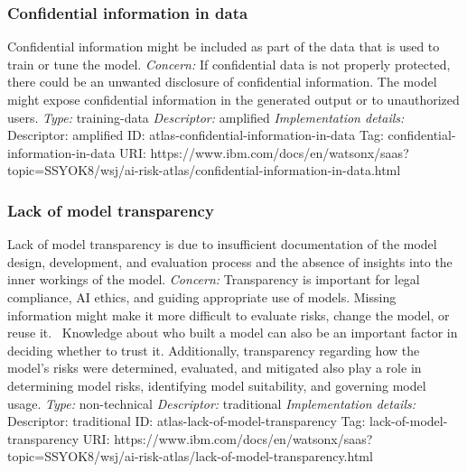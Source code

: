 \documentclass{article}
\begin{document}
\subsubsection*{Confidential information in data}
Confidential information might be included as part of the data that is used to train or tune the model.\newline
\textit{Concern: }If confidential data is not properly protected, there could be an unwanted disclosure of confidential information. The model might expose confidential information in the generated output or to unauthorized users.\newline\newline
\textit{Type: }training-data\newline
\textit{Descriptor: }amplified \newline\newline
\textit{Implementation details:} \newline
Descriptor: amplified \newline
ID: atlas-confidential-information-in-data \newline
Tag: confidential-information-in-data \newline
URI:  https://www.ibm.com/docs/en/watsonx/saas?topic=SSYOK8/wsj/ai-risk-atlas/confidential-information-in-data.html\newline
\subsubsection*{Lack of model transparency}
Lack of model transparency is due to insufficient documentation of the model design, development, and evaluation process and the absence of insights into the inner workings of the model.\newline
\textit{Concern: }Transparency is important for legal compliance, AI ethics, and guiding appropriate use of models. Missing information might make it more difficult to evaluate risks,  change the model, or reuse it.  Knowledge about who built a model can also be an important factor in deciding whether to trust it. Additionally, transparency regarding how the model's risks were determined, evaluated, and mitigated also play a role in determining model risks, identifying model suitability, and governing model usage.\newline\newline
\textit{Type: }non-technical\newline
\textit{Descriptor: }traditional \newline\newline
\textit{Implementation details:} \newline
Descriptor: traditional \newline
ID: atlas-lack-of-model-transparency \newline
Tag: lack-of-model-transparency \newline
URI:  https://www.ibm.com/docs/en/watsonx/saas?topic=SSYOK8/wsj/ai-risk-atlas/lack-of-model-transparency.html\newline
\end{document}
